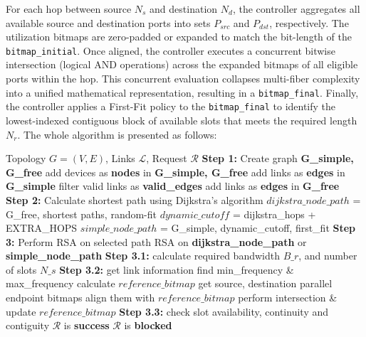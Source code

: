 \documentclass[conference]{IEEEtran}
\begin{document}
For each hop between source $N_s$ and destination $N_d$, the controller aggregates all available source and destination ports into sets $P_{src}$ and $P_{dst}$, respectively. The utilization bitmaps are zero-padded or expanded to match the bit-length of the \texttt{bitmap\_initial}. Once aligned, the controller executes a concurrent bitwise intersection (logical AND operations) across the expanded bitmaps of all eligible ports within the hop. This concurrent evaluation collapses multi-fiber complexity into a unified mathematical representation, resulting in a \texttt{bitmap\_final}. Finally, the controller applies a First-Fit policy to the \texttt{bitmap\_final} to identify the lowest-indexed contiguous block of available slots that meets the required length $N_r$. The whole algorithm is presented as follows:
\begin{algorithm}
    \caption{RSA with parallel links}
    \begin{algorithmic}[1] %
        \REQUIRE Topology $G=(V, E)$, Links $\mathcal{L}$, Request $\mathcal{R}$
        \STATE \textbf{Step 1:} Create graph \textbf{G\_simple, G\_free}
        \STATE add devices as \textbf{nodes} in \textbf{G\_simple, G\_free}
        \STATE add links as \textbf{edges} in \textbf{G\_simple}
        \STATE filter valid links as \textbf{valid\_edges}
        \STATE add links as \textbf{edges} in \textbf{G\_free}
        \ENDFOR
        \STATE \textbf{Step 2:} Calculate shortest path using Dijkstra's algorithm
        \STATE $dijkstra\_node\_path$ = G\_free, shortest paths, random-fit
        \STATE $dynamic\_cutoff$ = dijkstra\_hops + EXTRA\_HOPS
        \STATE $simple\_node\_path$ = G\_simple, dynamic\_cutoff, first\_fit
        \STATE \textbf{Step 3:} Perform RSA on selected path
        \STATE RSA on \textbf{dijkstra\_node\_path} or \textbf{simple\_node\_path}
        \STATE \textbf{Step 3.1:}
        \STATE calculate required bandwidth $B\_r$, and number of slots $N\_s$
        \STATE \textbf{Step 3.2:}
        \STATE get link information
        \STATE find min\_frequency \& max\_frequency
        \STATE calculate $reference\_bitmap$
        \STATE get source, destination parallel endpoint bitmaps
        \STATE align them with $reference\_bitmap$
        \STATE perform intersection \& update $reference\_bitmap$
        \ENDFOR
        \STATE \textbf{Step 3.3:}
        \STATE check slot availability, continuity and contiguity
        \STATE $\mathcal{R}$ is \textbf{success}
        \ELSE
        \STATE $\mathcal{R}$ is \textbf{blocked}
        \ENDIF
    \end{algorithmic}
\end{algorithm}
\end{document}
